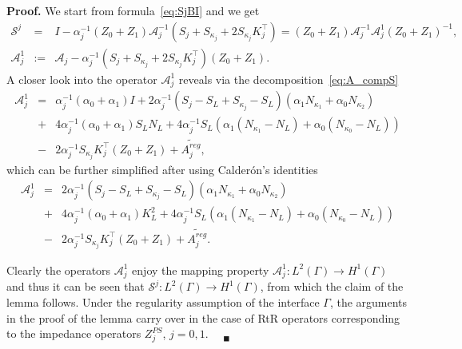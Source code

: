 \documentclass[11pt]{article}
\numberwithin{equation}{section}
\newenvironment{proof}{\hspace{0.5cm} {\bf Proof.}}
{$\quad {}_\blacksquare$\vspace{0.3cm}}
\begin{document}
\begin{proof}
We start from formula~\eqref{eq:SjBI} and we get
\begin{eqnarray*}
  \mathcal{S}^j&=&I-\alpha_j^{-1}(Z_0+Z_1)\mathcal{A}_j^{-1}(S_j+S_{\kappa_j}+2S_{\kappa_j}K_j^\top)=(Z_0+Z_1)\mathcal{A}_j^{-1}\mathcal{A}_j^1(Z_0+Z_1)^{-1},\\
  \mathcal{A}_j^1&:=&\mathcal{A}_j-\alpha_j^{-1}(S_j+S_{\kappa_j}+2S_{\kappa_j}K_j^\top)(Z_0+Z_1).
\end{eqnarray*}
A closer look into the operator $\mathcal{A}_j^1$ reveals via the decomposition~\eqref{eq:A_compS}
\begin{eqnarray*}
  \mathcal{A}_j^1&=&\alpha_j^{-1}(\alpha_0+\alpha_1)I+2\alpha_j^{-1}(S_j-S_L+S_{\kappa_j}-S_L)(\alpha_1N_{\kappa_1}+\alpha_0N_{\kappa_2})\nonumber\\
  &+&4\alpha_j^{-1}(\alpha_0+\alpha_1)S_LN_L+4\alpha_j^{-1}S_L(\alpha_1(N_{\kappa_1}-N_L)+\alpha_0(N_{\kappa_0}-N_L))\\
  &-&2\alpha_j^{-1}S_{\kappa_j}K_j^\top(Z_0+Z_1)+\widetilde{A_j^{reg}},
\end{eqnarray*}
which can be further simplified after using Calder\'on's identities
\begin{eqnarray*}
  \mathcal{A}_j^1&=&2\alpha_j^{-1}(S_j-S_L+S_{\kappa_j}-S_L)(\alpha_1N_{\kappa_1}+\alpha_0N_{\kappa_2})\\
  &+&4\alpha_j^{-1}(\alpha_0+\alpha_1)K_L^2+4\alpha_j^{-1}S_L(\alpha_1(N_{\kappa_1}-N_L)+\alpha_0(N_{\kappa_0}-N_L))\\
  &-&2\alpha_j^{-1}S_{\kappa_j}K_j^\top(Z_0+Z_1)+\widetilde{A_j^{reg}}.
\end{eqnarray*}


Clearly the operators $\mathcal{A}_j^1$ enjoy the mapping property $\mathcal{A}_j^1:L^2(\Gamma)\to H^1(\Gamma)$ and thus it can be seen that $\mathcal{S}^j:L^2(\Gamma)\to H^1(\Gamma)$, from which the claim of the lemma follows. Under the regularity assumption of the interface $\Gamma$, the arguments in the proof of the lemma carry over in the case of RtR operators corresponding to the impedance operators $Z_j^{PS}$, $j=0,1$.
\end{proof}
\end{document}
